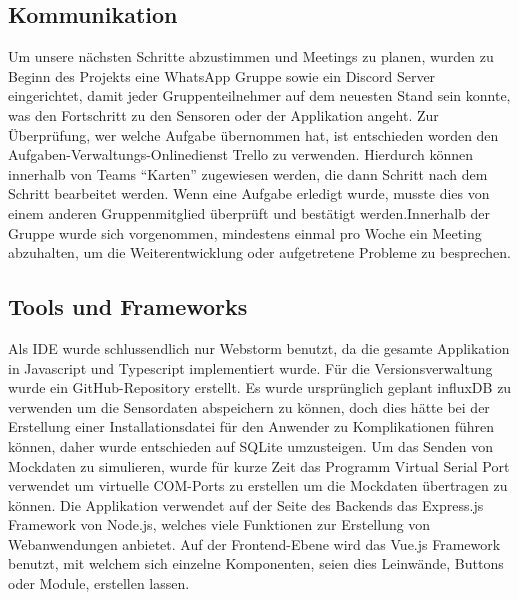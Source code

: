 \documentclass[]{article}
\begin{document}
	\subsection{Kommunikation}
	Um unsere nächsten Schritte abzustimmen und Meetings zu planen, wurden zu Beginn des Projekts eine WhatsApp Gruppe sowie ein Discord Server eingerichtet, damit jeder Gruppenteilnehmer auf dem neuesten Stand sein konnte, was den Fortschritt zu den Sensoren oder der Applikation angeht. Zur Überprüfung, wer welche Aufgabe übernommen hat, ist entschieden worden den Aufgaben-Verwaltungs-Onlinedienst Trello zu verwenden. Hierdurch können innerhalb von Teams “Karten” zugewiesen werden, die dann Schritt nach dem Schritt bearbeitet werden. Wenn eine Aufgabe erledigt wurde, musste dies von einem anderen Gruppenmitglied überprüft und bestätigt werden.\newline Innerhalb der Gruppe wurde sich vorgenommen, mindestens einmal pro Woche ein Meeting abzuhalten, um die Weiterentwicklung oder aufgetretene Probleme zu besprechen.
	
	\subsection{Tools und Frameworks}
	Als IDE wurde schlussendlich nur Webstorm benutzt, da die gesamte Applikation in Javascript und Typescript implementiert wurde. Für die Versionsverwaltung wurde ein GitHub-Repository erstellt. Es wurde ursprünglich geplant influxDB zu verwenden um die Sensordaten abspeichern zu können, doch dies hätte bei der Erstellung einer Installationsdatei für den Anwender zu Komplikationen führen können, daher wurde entschieden auf SQLite umzusteigen. Um das Senden von Mockdaten zu simulieren, wurde für kurze Zeit das Programm Virtual Serial Port verwendet um virtuelle COM-Ports zu erstellen um die Mockdaten übertragen zu können.\newline
	Die Applikation verwendet auf der Seite des Backends das Express.js Framework von Node.js, welches viele Funktionen zur Erstellung von Webanwendungen anbietet. Auf der Frontend-Ebene wird das Vue.js Framework benutzt, mit welchem sich einzelne Komponenten, seien dies Leinwände, Buttons oder Module, erstellen lassen. 
	
\end{document}
